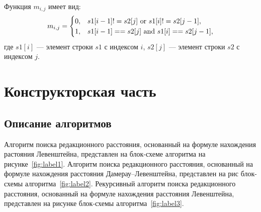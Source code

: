 \documentclass[14pt]{article}
\begin{document}
Функция $m_{i, j}$ имеет вид:
\begin{equation}\label{for: cas1}
	m_{i, j} = 
	\begin{cases}
		0, & s1[i - 1] != s2[j] $ or $ s1[i] != s2[j - 1], \\
		1, & s1[i - 1] == s2[j]$ and $s1[i] == s2[j - 1],
	\end{cases}
\end{equation}
где $s1[i]$ --- элемент строки $s1$ с индексом $i$, $s2[j]$ --- элемент строки $s2$ с индексом $j$.\\

\newpage
\section{Конструкторская часть}
\subsection{Описание алгоритмов}
Алгоритм поиска редакционного расстояния, основанный на формуле нахождения растояния Левенштейна, представлен на блок-схеме алгоритма на рисунке~\ref{fig:label1}.
Алгоритм поиска редакционного расстояния, основанный на формуле нахождения расстояния Дамерау--Левенштейна, представлен на рис блок-схемы алгоритма~\ref{fig:label2}.
Рекурсивный алгоритм поиска редакционного расстояния, основанный на формуле нахождения расстояния Левенштейна, представлен на рисунке блок-схемы алгоритма~\ref{fig:label3}.
\end{document}
